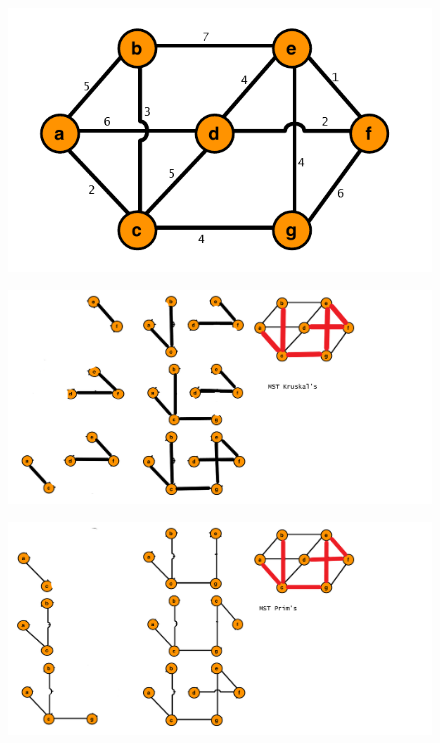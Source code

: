 \documentclass{article}
\begin{document}
\begin{enumerate}
        \begin{figure}[h!]
        \begin{center}
        \includegraphics[scale=0.5]{weighted_graph.png} 
        \end{center}
        \end{figure}
        \begin{figure}[h!]
        \begin{center}
        \includegraphics[scale=0.5]{mst_kruskal.png} 
        \end{center}
        \end{figure}
        \begin{figure}[h!]
        \begin{center}
        \includegraphics[scale=0.5]{mst_prim.png} 

\end{center}
\end{figure}
\end{enumerate}
\end{document}
